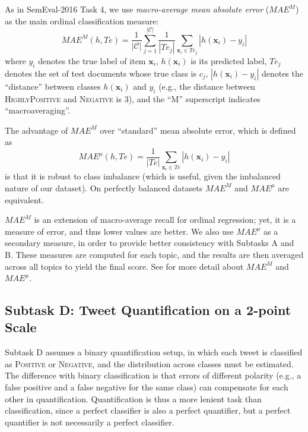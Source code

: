 \documentclass[11pt,a4paper]{article}
\begin{document}
As in SemEval-2016 Task 4, we use \emph{macro-average mean absolute
error} ($MAE^{M}$) as the main ordinal classification measure:
%
\begin{equation}
  \label{eq:macroMAE}MAE^{M}(h,Te) =
  \frac{1}{|\mathcal{C}|}\sum_{j=1}^{|\mathcal{C}|}\frac{1}{|Te_{j}|}\sum_{\mathbf{x}_{i}\in
  Te_{j}}|h(\mathbf{x}_{i})-y_{i}| \nonumber
\end{equation}
%
\noindent where $y_{i}$ denotes the true label of item
$\mathbf{x}_{i}$, $h(\mathbf{x}_{i})$ is its predicted label,
$Te_{j}$ denotes the set of test documents whose true class is
$c_{j}$, $|h(\mathbf{x}_{i})-y_{i}|$ denotes the ``distance'' between
classes $h(\mathbf{x}_{i})$ and $y_{i}$ (e.g., the distance between
\textsc{HighlyPositive} and \textsc{Negative} is 3), and the ``M''
superscript indicates ``macroaveraging''.

The advantage of $MAE^{M}$ over ``standard'' mean absolute error,
which is defined as
%
\begin{equation}\label{eq:microMAE}MAE^{\mu}(h,Te)=\frac{1}{
  |Te|}\sum_{\mathbf{x}_{i}\in
  Te}|h(\mathbf{x}_{i})-y_{i}|\end{equation}
% 
\noindent is that it is robust to class imbalance (which is
useful, given the imbalanced nature of our dataset). On perfectly
balanced datasets $MAE^{M}$ and $MAE^{\mu}$ are equivalent.


\noindent $MAE^{M}$ is an extension of macro-average recall for ordinal regression; yet, it is a measure of error, and thus lower values are better. 
We also use $MAE^{\mu}$ as a secondary measure, in order to provide better consistency with Subtasks A and B. These measures are computed for each
topic, and the results are then averaged across all topics to yield
the final score. 
See \cite{Baccianella:2009qd} for more detail about $MAE^{M}$ and $MAE^{\mu}$. 


\subsection{Subtask D: Tweet Quantification on a 2-point Scale}

Subtask D assumes a binary quantification setup, in which each tweet is classified as \textsc{Positive} or \textsc{Negative}, and the distribution across classes must be estimated. %
The difference with binary classification is that errors of different polarity (e.g., a false positive and a false negative for the same
class) can compensate for each other in quantification. Quantification is thus
a more lenient task than classification,
since a perfect classifier is also a perfect quantifier,
but a perfect quantifier is not necessarily a perfect classifier.
\end{document}

